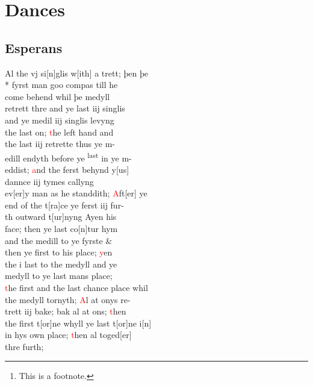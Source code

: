 \documentclass[12pt,letter]{article} %
\newcommand{\red}[1]{\textcolor{red}{#1}}
\newcommand{\srcpg}[1]{
    \noindent{
        \color{Gray}{\rule[0.5ex]{\linewidth}{1pt}~#1} 
        \\
    }
}
\begin{document}
    \title{\rmfamily\normalfont{}}
    \author{}
    \date{} %
    
    \maketitle
    
    \begin{abstract}
        \noindent\lipsum[1] Just a test.\footnote{This is a footnote.}
    \end{abstract}
       
    \tableofcontents
\newpage

    \section{Dances}
    \reversemarginpar
    \subsection{Esperans} \raggedright 
{}\srcpg{54} Al the vj si{[}n{]}glis w{[}ith{]} a trett; þen þe \\* 
fyrst man goo compas till he \\ 
come behend whil þe medyll \\ 
retrett thre and ye last iij singlis \\ 
and ye medil iij singlis levyng\\ 
the last on; \red{t}he left hand and \\
the last iij retrette thus ye m-\\
edill endyth before ye \textsuperscript{last} in ye m-\\
eddist; \red{a}nd the ferst behynd y{[}us{]} \\ 
dannce iij tymes callyng\\ 
ev{[}er{]}y man as he standdith; \red{A}ft{[}er{]} ye\\
end of the t{[}ra{]}ce ye ferst iij fur-\\
th outward t{[}ur{]}nyng Ayen his \\ 
face; then ye  last co{[}n{]}tur hym \\ 
and the medill to ye fyrste \& \\
then ye first to his place; \red{y}en \\ 
the i last to the medyll and ye \\ 
\srcpg{55} medyll to ye last mans  place; \\ 
\red{t}he first and the last chance place whil \\ 
the medyll tornyth; \red{A}l at onys re-\\
trett iij bake; bak al  at ons; \red{t}hen \\ 
the first t{[}or{]}ne whyll ye last t{[}or{]}ne i{[}n{]} \\ 
in hys own place; \red{t}hen al toged{[}er{]}\\ 
thre furth;
\end{document}
